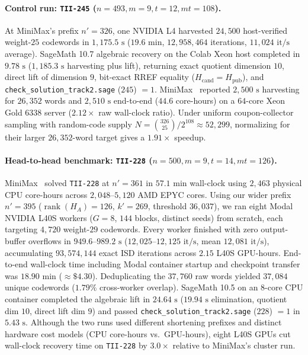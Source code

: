 \documentclass[11pt,a4paper]{article}
\begin{document}
\paragraph{Control run: \texttt{TII-245} ($n=493, m=9, t=12, mt=108$).}
At MiniMax's prefix $n'=326$, one NVIDIA L4 harvested $24{,}500$ host-verified weight-$25$ codewords in $1{,}175.5\text{ s}$ ($19.6\text{ min}$, $12{,}958{,}464$ iterations, $11{,}024\text{ it/s}$ average). SageMath 10.7 algebraic recovery on the Colab Xeon host completed in $9.78\text{ s}$ ($1{,}185.3\text{ s}$ harvesting plus lift), returning exact quotient dimension $10$, direct lift of dimension $9$, bit-exact RREF equality ($H_{\mathrm{cand}} = H_{\mathrm{pub}}$), and \texttt{check\_solution\_track2.sage} ($245$) $= 1$. MiniMax~\cite{MiniMax26} reported $2{,}500\text{ s}$ harvesting for $26{,}352$ words and $2{,}510\text{ s}$ end-to-end ($44.6$ core-hours) on a $64$-core Xeon Gold 6338 server ($2.12\times$ raw wall-clock ratio). Under uniform coupon-collector sampling with random-code supply $N = \binom{326}{25}/2^{108} \approx 52{,}299$, normalizing for their larger $26{,}352$-word target gives a $1.91\times$ speedup.

\paragraph{Head-to-head benchmark: \texttt{TII-228} ($n=500, m=9, t=14, mt=126$).}
MiniMax~\cite{MiniMax26} solved \texttt{TII-228} at $n'=361$ in $57.1\text{ min}$ wall-clock using $2{,}463$ physical CPU core-hours across $2{,}048\text{--}5{,}120$ AMD EPYC cores. Using our wider prefix $n'=395$ ($\operatorname{rank}(H_A)=126$, $k'=269$, threshold $36{,}037$), we ran eight Modal NVIDIA L40S workers ($G=8$, $144$ blocks, distinct seeds) from scratch, each targeting $4{,}720$ weight-$29$ codewords. Every worker finished with zero output-buffer overflows in $949.6\text{--}989.2\text{ s}$ ($12{,}025\text{--}12{,}125\text{ it/s}$, mean $12{,}081\text{ it/s}$), accumulating $93{,}574{,}144$ exact ISD iterations across $2.15$ L40S GPU-hours. End-to-end wall-clock time including Modal container startup and checkpoint transfer was $18.90\text{ min}$ ($\approx\$4.30$). Deduplicating the $37{,}760$ raw words yielded $37{,}084$ unique codewords ($1.79\%$ cross-worker overlap). SageMath 10.5 on an $8$-core CPU container completed the algebraic lift in $24.64\text{ s}$ ($19.94\text{ s}$ elimination, quotient dim $10$, direct lift dim $9$) and passed \texttt{check\_solution\_track2.sage} ($228$) $= 1$ in $5.43\text{ s}$. Although the two runs used different shortening prefixes and distinct hardware cost models (CPU core-hours vs.\ GPU-hours), eight L40S GPUs cut wall-clock recovery time on \texttt{TII-228} by $3.0\times$ relative to MiniMax's cluster run.
\end{document}
